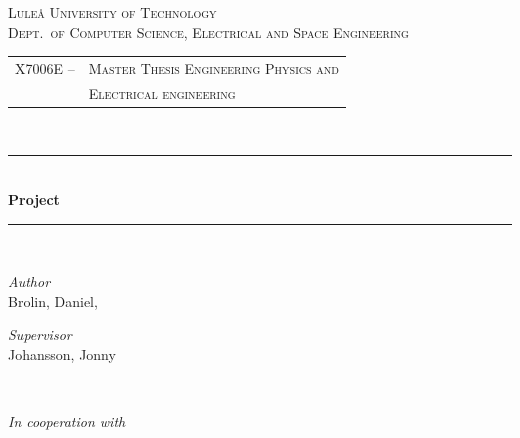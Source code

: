 \newcommand{\HRule}{\rule{\linewidth}{0.5mm}}
\center %


\textsc{\LARGE Luleå University of Technology}\\[1.5cm] %

\textsc{\Large Dept.\ of Computer Science, Electrical and Space Engineering}\\[0.5cm] %

\begin{centering}
\begin{tabular}{l l}
\textsc{\large X7006E --}	& \textsc{\large  Master Thesis Engineering Physics and}\\
				& \textsc{\large Electrical engineering} %
\end{tabular}
\end{centering}\\[0.5cm]

\HRule\\[0.8cm]
{\huge\bfseries Project \project}\\[0.4cm] %
\HRule\\[1.5cm]

\begin{minipage}{0.4\textwidth}
	\begin{flushleft}
		\large
		\emph{Author}\\
		Brolin, Daniel, \\ 
	\end{flushleft}
	\begin{flushleft}
		\large
		\textit{Supervisor}\\
		Johansson, Jonny
	\end{flushleft}
\end{minipage}
~
\begin{minipage}{0.4\textwidth}
	\begin{flushright}
		\large
		\textit{In cooperation with}\\
		\Large{\company}
	\end{flushright}
\end{minipage}

